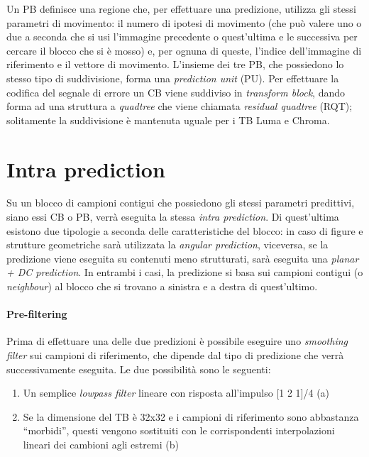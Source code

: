 Un PB definisce una regione che, per effettuare una predizione, utilizza gli 
stessi parametri di movimento: il numero di ipotesi di movimento (che può 
valere uno o due a seconda che si usi l'immagine precedente o quest'ultima 
e le successiva per cercare il blocco che si è mosso) e, per ognuna di queste, 
l'indice dell'immagine di riferimento e il vettore di movimento.
L'insieme dei tre PB, che possiedono lo stesso tipo di suddivisione, 
forma una \emph{prediction unit} (PU).
Per effettuare la codifica del segnale di errore un CB viene suddiviso in 
\emph{transform block}, dando forma ad una struttura a \emph{quadtree} che 
viene chiamata \emph{residual quadtree} (RQT); solitamente la suddivisione 
è mantenuta uguale per i TB Luma e Chroma.

\section{Intra prediction}
Su un blocco di campioni contigui che possiedono gli stessi parametri 
predittivi, siano essi CB o PB, verrà eseguita la stessa 
\emph{intra prediction}.
Di quest'ultima esistono due tipologie a seconda delle caratteristiche 
del blocco: in caso di figure e strutture geometriche sarà utilizzata 
la \emph{angular prediction}, viceversa, se la predizione viene eseguita 
su contenuti meno strutturati, sarà eseguita una \emph{planar + DC prediction}. 
In entrambi i casi, la predizione si basa sui campioni contigui (o 
\emph{neighbour}) al blocco che si trovano a sinistra e a destra di 
quest'ultimo.

\paragraph*{Pre-filtering}
Prima di effettuare una delle due predizioni è possibile eseguire uno 
\emph{smoothing filter} sui campioni di riferimento, che dipende dal tipo di 
predizione che verrà successivamente eseguita. Le due possibilità sono le 
seguenti:
\begin{enumerate}
\item Un semplice \emph{lowpass filter} lineare con risposta all'impulso 
[1 2 1]/4 (a)
\item Se la dimensione del TB è 32x32 e i campioni di riferimento sono 
abbastanza ``morbidi'', questi vengono sostituiti con le corrispondenti 
interpolazioni lineari dei cambioni agli estremi (b)
\end{enumerate}

